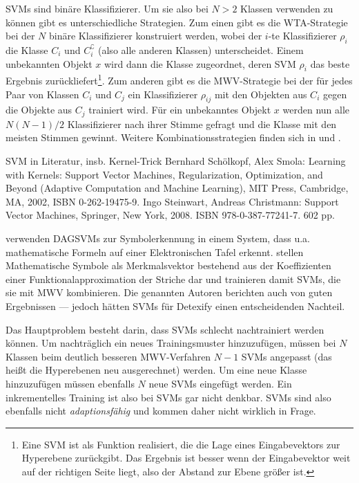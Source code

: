 \ac{SVM}s sind binäre Klassifizierer. Um sie also bei $N>2$ Klassen verwenden zu können gibt es unterschiedliche Strategien. Zum einen gibt es die \ac{WTA}-Strategie bei der $N$ binäre Klassifizierer konstruiert werden, wobei der $i$-te Klassifizierer $\rho_i$ die Klasse $C_i$ und $C_i^{\complement}$ (also alle anderen Klassen) unterscheidet. Einem unbekannten Objekt $x$ wird dann die Klasse zugeordnet, deren SVM $\rho_i$ das beste Ergebnis zurückliefert\footnote{Eine SVM ist als Funktion realisiert, die die Lage eines Eingabevektors zur Hyperebene zurückgibt. Das Ergebnis ist besser wenn der Eingabevektor weit auf der richtigen Seite liegt, also der Abstand zur Ebene größer ist.}. Zum anderen gibt es die \ac{MWV}-Strategie bei der für jedes Paar von Klassen $C_i$ und $C_j$ ein Klassifizierer $\rho_{ij}$ mit den Objekten aus $C_i$ gegen die Objekte aus $C_j$ trainiert wird. Für ein unbekanntes Objekt $x$ werden nun alle $N(N-1)/2$ Klassifizierer nach ihrer Stimme gefragt und die Klasse mit den meisten Stimmen gewinnt. Weitere Kombinationsstrategien finden sich in \cite{Duan:2005p11426} und \cite{Platt:2000p11488}.

\TODO SVM in Literatur, insb. Kernel-Trick Bernhard Schölkopf, Alex Smola: Learning with Kernels: Support Vector Machines, Regularization, Optimization, and Beyond (Adaptive Computation and Machine Learning), MIT Press, Cambridge, MA, 2002, ISBN 0-262-19475-9. Ingo Steinwart, Andreas Christmann: Support Vector Machines, Springer, New York, 2008. ISBN 978-0-387-77241-7. 602 pp.

\citet{Tapia:2003p11202,Tapia:2005p11236} verwenden \ac{DAGSVM}s \cite{Platt:2000p11488} zur Symbolerkennung in einem System, dass u.a. mathematische Formeln auf einer Elektronischen Tafel erkennt.
\citet{Golubitsky:2009p2456,Keshari:2008p528,Golubitsky:2009p2321} stellen Mathematische Symbole als Merkmalsvektor bestehend aus der Koeffizienten einer Funktionalapproximation der Striche dar und trainieren damit \ac{SVM}s, die sie mit \ac{MWV} kombinieren. Die genannten Autoren berichten auch von guten Ergebnissen — jedoch hätten \ac{SVM}s für Detexify einen entscheidenden Nachteil.

Das Hauptproblem besteht darin, dass SVMs schlecht nachtrainiert werden können. Um nachträglich ein neues Trainingsmuster hinzuzufügen, müssen bei $N$ Klassen beim deutlich besseren MWV-Verfahren \cite{Duan:2005p11426} $N-1$ SVMs angepasst (das heißt die Hyperebenen neu ausgerechnet) werden. Um eine neue Klasse hinzuzufügen müssen ebenfalls $N$ neue SVMs eingefügt werden. Ein inkrementelles Training ist also bei SVMs gar nicht denkbar. SVMs sind also ebenfalls nicht \emph{adaptionsfähig} und kommen daher nicht wirklich in Frage.

